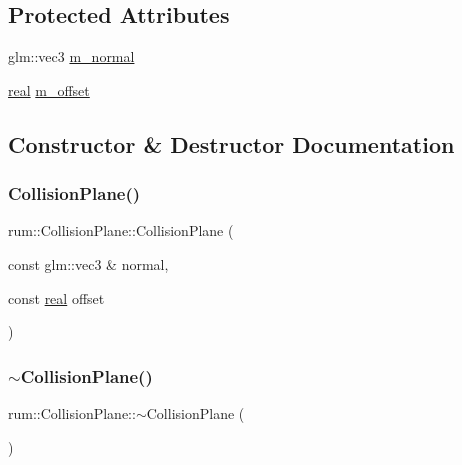 \subsection*{Protected Attributes}
\begin{DoxyCompactItemize}
\item 
glm\+::vec3 \hyperlink{classrum_1_1_collision_plane_aa2f3d73f116cb6965cd561f25ea4b67e}{m\+\_\+normal}
\item 
\hyperlink{namespacerum_a7e8cca23573d5eaead0f138cbaa4862c}{real} \hyperlink{classrum_1_1_collision_plane_a0630544f46ad1830d7f73f94746f1f25}{m\+\_\+offset}
\end{DoxyCompactItemize}


\subsection{Constructor \& Destructor Documentation}
\mbox{\label{classrum_1_1_collision_plane_a60ce36cfda9ed15842ce762737a62ce5}} 
\subsubsection{\texorpdfstring{Collision\+Plane()}{CollisionPlane()}}
{\footnotesize\ttfamily rum\+::\+Collision\+Plane\+::\+Collision\+Plane (\begin{DoxyParamCaption}\item[{const glm\+::vec3 \&}]{normal,  }\item[{const \hyperlink{namespacerum_a7e8cca23573d5eaead0f138cbaa4862c}{real}}]{offset }\end{DoxyParamCaption})}

\mbox{\label{classrum_1_1_collision_plane_aed3fc45bbe236d0e3674745ed511ea14}} 
\subsubsection{\texorpdfstring{$\sim$\+Collision\+Plane()}{~CollisionPlane()}}
{\footnotesize\ttfamily rum\+::\+Collision\+Plane\+::$\sim$\+Collision\+Plane (\begin{DoxyParamCaption}{ }\end{DoxyParamCaption})}



